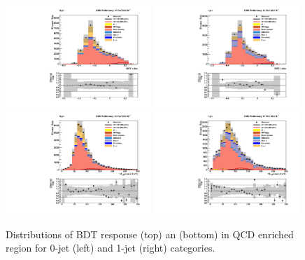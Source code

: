 \begin{figure}[!htpb]\centering
 \includegraphics[width=0.49\textwidth]{plots_and_figures/chapter6/qcd_cr/0_preselection_BDT_value.pdf}
 \includegraphics[width=0.49\textwidth]{plots_and_figures/chapter6/qcd_cr/1_preselection_BDT_value.pdf} \\
 \includegraphics[width=0.49\textwidth]{plots_and_figures/chapter6/qcd_cr/0_preselection_h_collmass_pfmet.pdf} 
 \includegraphics[width=0.49\textwidth]{plots_and_figures/chapter6/qcd_cr/1_preselection_h_collmass_pfmet.pdf} \\

 \caption{Distributions of BDT response (top) an \mcol (bottom) in QCD enriched region for 0-jet (left)  and 1-jet (right) categories.}
 \label{fig:qcd_cr}
\end{figure}

